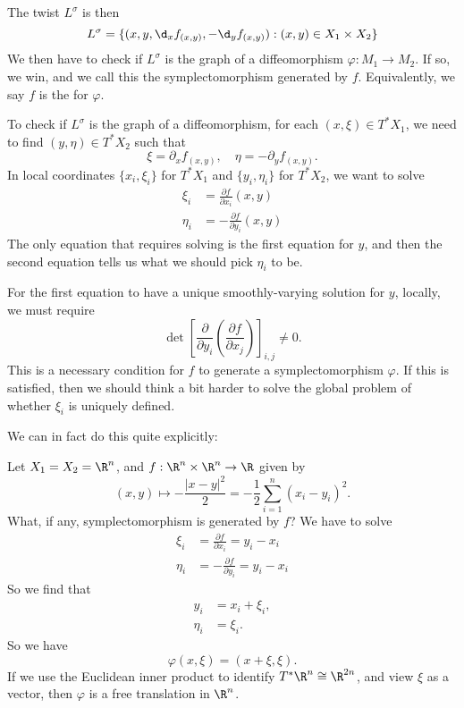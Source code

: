 \documentclass[a4paper]{article}
\begin{document}
The twist $L^\sigma$ is then
\[
  L^\sigma = \{(x, y, \d_x f_{(x, y)}, -\d_y f_{(x, y)}): (x, y) \in X_1 \times X_2\}
\]
We then have to check if $L^\sigma$ is the graph of a diffeomorphism $\varphi: M_1 \to M_2$. If so, we win, and we call this the symplectomorphism generated by $f$. Equivalently, we say $f$ is the  for $\varphi$.

To check if $L^\sigma$ is the graph of a diffeomorphism, for each $(x, \xi) \in T^*X_1$, we need to find $(y, \eta) \in T^* X_2$ such that
\[
  \xi = \partial_x f_{(x, y)},\quad \eta = -\partial_y f_{(x, y)}.
\]
In local coordinates $\{x_i, \xi_i\}$ for $T^* X_1$ and $\{y_i, \eta_i\}$ for $T^*X_2$, we want to solve
\begin{align*}
  \xi_i &= \frac{\partial f}{\partial x_i} (x, y)\\
  \eta_i &= - \frac{\partial f}{\partial y_i} (x, y)
\end{align*}
The only equation that requires solving is the first equation for $y$, and then the second equation tells us what we should pick $\eta_i$ to be.

For the first equation to have a unique smoothly-varying solution for $y$, locally, we must require
\[
  \det \left[\frac{\partial}{\partial y_i}\left(\frac{\partial f}{\partial x_j}\right)\right]_{i, j} \not= 0.
\]
This is a necessary condition for $f$ to generate a symplectomorphism $\varphi$. If this is satisfied, then we should think a bit harder to solve the global problem of whether $\xi_i$ is uniquely defined.

We can in fact do this quite explicitly:
\begin{eg}
  Let $X_1 = X_2 = \R^n$, and $f: \R^n \times \R^n \to \R$ given by
  \[
    (x, y) \mapsto - \frac{|x - y|^2}{2} = -\frac{1}{2} \sum_{i = 1}^n (x_i - y_i)^2.
  \]
  What, if any, symplectomorphism is generated by $f$? We have to solve
  \begin{align*}
    \xi_i &= \frac{\partial f}{\partial x_i} = y_i - x_i\\
    \eta_i &= -\frac{\partial f}{\partial y_i} = y_i - x_i
  \end{align*}
  So we find that
  \begin{align*}
    y_i &= x_i + \xi_i,\\
    \eta_i &= \xi_i.
  \end{align*}
  So we have
  \[
    \varphi(x, \xi) = (x + \xi, \xi).
  \]
  If we use the Euclidean inner product to identify $T^* \R^n \cong \R^{2n}$, and view $\xi$ as a vector, then $\varphi$ is a free translation in $\R^n$.
\end{eg}
\end{document}
